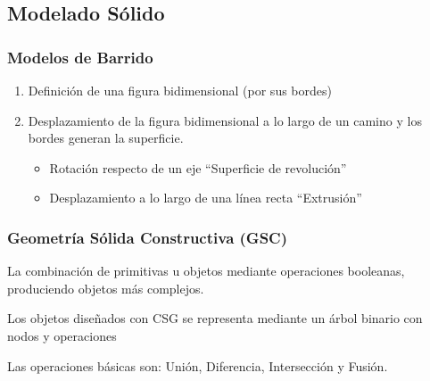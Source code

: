 \subsection{Modelado Sólido}
\subsubsection{Modelos de Barrido}
\begin{enumerate}
	\item Definición de una figura bidimensional (por sus bordes)
	\item Desplazamiento de la figura bidimensional a lo largo de un camino y los bordes generan la superficie.
	      \begin{itemize}
		      \item Rotación respecto de un eje “Superficie de revolución”
		      \item Desplazamiento a lo largo de una línea recta “Extrusión”
	      \end{itemize}
\end{enumerate}
\subsubsection{Geometría Sólida Constructiva (GSC)}
La combinación de primitivas u objetos mediante operaciones booleanas, produciendo objetos más complejos.

Los objetos diseñados con CSG se representa mediante un árbol binario con nodos y operaciones

Las operaciones básicas son: Unión, Diferencia, Intersección y Fusión.